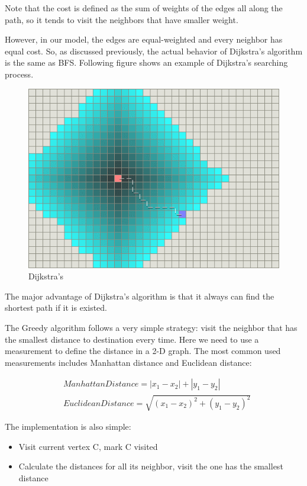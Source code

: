 \documentclass[12pt]{article}
\begin{document}
Note that the cost is defined as the sum of weights of the edges all along the path, so it tends to visit the neighbors that have smaller weight.

However, in our model, the edges are equal-weighted and every neighbor has equal cost. 
So, as discussed previously, the actual behavior of Dijkstra's algorithm is the same as BFS. 
Following figure shows an example of Dijkstra's searching process.

\begin{figure}[H]
    \centering 
    \includegraphics[scale = 0.6]{3.png}
    \caption{Dijkstra's}
\end{figure}

The major advantage of Dijkstra's algorithm is that it always can find the shortest path if it is existed.

The Greedy algorithm follows a very simple strategy: visit the neighbor that has the smallest distance to destination every time. Here we need to use a measurement to define the distance in a 2-D graph. The most common used measurements includes Manhattan distance and Euclidean distance:

\begin{equation*}
    \begin{split}
        &Manhattan Distance = |x_1-x_2|+|y_1-y_2|\\
        &Euclidean Distance = \sqrt{(x_1-x_2)^2+(y_1-y_2)^2}
    \end{split}
\end{equation*}

The implementation is also simple:
\begin{itemize}
    \item Visit current vertex C, mark C visited
    \item Calculate the distances for all its neighbor, visit the one has the smallest distance
\end{itemize}
\end{document}
